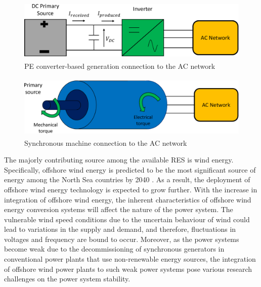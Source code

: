 \begin{figure}[H]
\centering
    \includegraphics[height = 3cm,width = 12cm]{Diagrams/Chapter_1/Energy_conv_system_2.pdf}
    \caption{PE converter-based generation connection to the AC network \cite{denis_migrate_2018}}
    \label{fig:Energy_conv_system_2}
\end{figure}
\vspace{0mm}
\begin{figure}[H]
\centering
    \includegraphics[height = 3cm,width = 12.5cm]{Diagrams/Chapter_1/Energy_conv_system.pdf}
    \caption{Synchronous machine connection to the AC network \cite{denis_migrate_2018}}
    \label{fig:Energy_conv_system}
\end{figure}

The majorly contributing source among the available \gls{RES} is wind energy. Specifically, offshore wind energy is predicted to be the most significant source of energy among the North Sea countries by 2040 \cite{muller2017translate}. As a result, the deployment of offshore wind energy technology is expected to grow further. With the increase in integration of offshore wind energy, the inherent characteristics of offshore wind energy conversion systems will affect the nature of the power system. The vulnerable wind speed conditions due to the uncertain behaviour of wind could lead to variations in the supply and demand, and therefore, fluctuations in voltages and frequency are bound to occur. Moreover, as the power systems become weak due to the decommissioning of synchronous generators in conventional power plants that use non-renewable energy sources, the integration of offshore wind power plants to such weak power systems pose various research challenges on the power system stability. 


